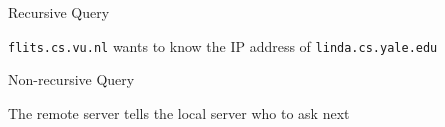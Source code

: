 \begin{frame}{Recursive Query}
  \begin{block}{\texttt{flits.cs.vu.nl} wants to know the IP address of
      \texttt{linda.cs.yale.edu}}
    \begin{center}
    \end{center}
  \end{block}
\end{frame}

\begin{frame}{Non-recursive Query}
  \begin{block}{The remote server tells the local server who to ask next}
    \begin{center}
    \end{center}
    \label{fig:non_recursive}
  \end{block}
\end{frame}

